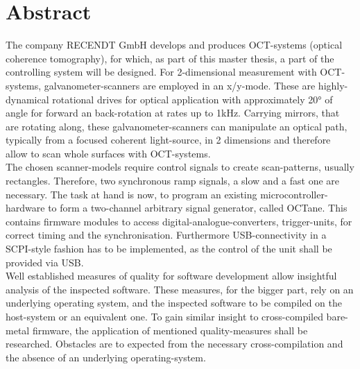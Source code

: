 \chapter{Abstract}

The company RECENDT GmbH develops and produces OCT-systems (optical coherence tomography), for which, as part of this master thesis, a part of the controlling system will be designed. For 2-dimensional measurement with OCT-systems, galvanometer-scanners are employed in an x/y-mode. These are highly-dynamical rotational drives for optical application with approximately 20° of angle for forward an back-rotation at rates up to 1kHz. Carrying mirrors, that are rotating along, these galvanometer-scanners can manipulate an optical path, typically from a focused coherent light-source, in 2 dimensions and therefore allow to scan whole surfaces with OCT-systems. \\

The chosen scanner-models require control signals to create scan-patterns, usually rectangles. Therefore, two synchronous ramp signals, a slow and a fast one are necessary. The task at hand is now, to program an existing microcontroller-hardware to form a two-channel arbitrary signal generator, called OCTane. This contains firmware modules to access digital-analogue-converters, trigger-units, for correct timing and the synchronisation. Furthermore USB-connectivity in a SCPI-style fashion has to be implemented, as the control of the unit shall be provided via USB. \\

Well established measures of quality for software development allow insightful analysis of the inspected software. These measures, for the bigger part, rely on an underlying operating system, and the inspected software to be compiled on the host-system or an equivalent one. To gain similar insight to cross-compiled bare-metal firmware, the application of mentioned quality-measures shall be researched. Obstacles are to expected from the necessary cross-compilation and the absence of an underlying operating-system.
